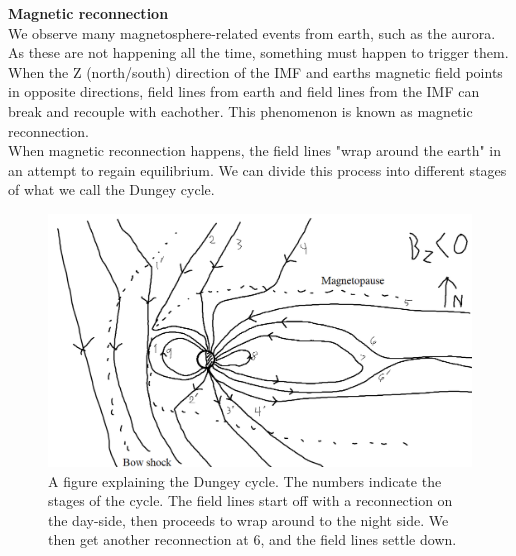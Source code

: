\documentclass[norsk,a4paper,12pt]{article}
\begin{document}
\begin{multicols}{2}
	\textbf{Magnetic reconnection}\\
	We observe many magnetosphere-related events from earth, such as the aurora. As these are not happening all the time, something must happen to 				trigger them.\\  
	When the Z (north/south) direction of the IMF and earths magnetic field points in opposite directions, field lines from earth and field lines from the IMF can 			break and recouple with eachother. This phenomenon is known as magnetic reconnection.\\
	When magnetic reconnection happens, the field lines "wrap around the earth" in an attempt to regain equilibrium. We can divide this process into different 			stages of what we call the Dungey cycle.
	\begin{figure}[H]
		\includegraphics[scale = 0.3]{Figures/Dungey_cycle_negative.png}
		\centering
		\caption{A figure explaining the Dungey cycle. The numbers indicate the stages of the cycle. The field lines start off with a reconnection on the day-side, then proceeds to wrap around to the night side. We then get another reconnection at 6, and the field lines settle down. }
		\label{fig:dungey_cycle}
	\end{figure}


\end{multicols}
\end{document}
